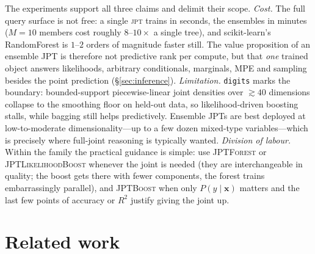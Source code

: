 \documentclass[11pt]{article}
\theoremstyle{plain}
\theoremstyle{definition}
\theoremstyle{remark}
\newcommand{\jpt}{\textsc{jpt}}
\newcommand{\jptforest}{\textsc{JPTForest}}
\newcommand{\likeboost}{\textsc{JPTLikelihoodBoost}}
\newcommand{\jptboost}{\textsc{JPTBoost}}
\begin{document}
The experiments support all three claims and delimit their scope.
\emph{Cost.} The full query surface is not free: a single \jpt{} trains
in seconds, the ensembles in minutes ($M{=}10$ members cost roughly
$8$--$10\times$ a single tree), and scikit-learn's RandomForest is
$1$--$2$ orders of magnitude faster still. The value proposition of an
ensemble JPT is therefore not predictive rank per compute, but that
\emph{one} trained object answers likelihoods, arbitrary conditionals,
marginals, MPE and sampling besides the point prediction
(\S\ref{sec:inference}). \emph{Limitation.} \texttt{digits} marks the
boundary: bounded-support piecewise-linear joint densities over
${\gtrsim}40$ dimensions collapse to the smoothing floor on held-out
data, so likelihood-driven boosting stalls, while bagging still helps
predictively. Ensemble JPTs are best deployed at low-to-moderate
dimensionality---up to a few dozen mixed-type variables---which is
precisely where full-joint reasoning is typically wanted.
\emph{Division of labour.} Within the family the practical guidance is
simple: use \jptforest{} or \likeboost{} whenever the joint is needed
(they are interchangeable in quality; the boost gets there with fewer
components, the forest trains embarrassingly parallel), and
\jptboost{} when only $P(y\mid\mathbf x)$ matters and the last few
points of accuracy or $R^2$ justify giving the joint up.

\section{Related work}
\label{sec:related}
\end{document}
